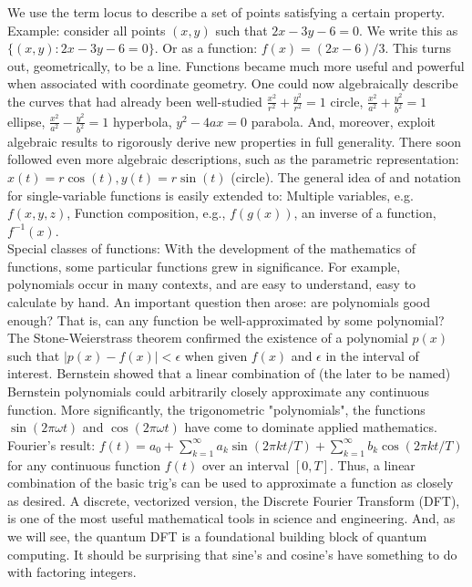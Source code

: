 \documentclass[main.tex]{subfiles}
\begin{document}
We use the term locus to describe a set of points satisfying a certain property. Example: consider all points $(x, y)$ such that $2 x-3 y-6=0$. We write this as $\{(x, y): 2 x-3 y-6=0\}$. Or as a function: $f(x)=(2 x-6) / 3$. This turns out, geometrically, to be a line. Functions became much more useful and powerful when associated with coordinate geometry. One could now algebraically describe the curves that had already been well-studied $\frac{x^{2}}{r^{2}}+\frac{y^{2}}{r^{2}}=1$ circle, $\frac{x^{2}}{a^{2}}+\frac{y^{2}}{b^{2}}=1$ ellipse, $\frac{x^{2}}{a^{2}}-\frac{y^{2}}{b^{2}}=1$ hyperbola, $y^{2}-4 a x=0$ parabola. And, moreover, exploit algebraic results to rigorously derive new properties in full generality. There soon followed even more algebraic descriptions, such as the parametric representation: $x(t)=r \cos (t), y(t)=r \sin (t)$ (circle). The general idea of and notation for single-variable functions is easily extended to: Multiple variables, e.g. $f(x, y, z)$, Function composition, e.g., $f(g(x))$, an inverse of a function, $f^{-1}(x)$.\\

Special classes of functions: With the development of the mathematics of functions, some particular functions grew in significance. For example, polynomials occur in many contexts, and are easy to understand, easy to calculate by hand. An important question then arose: are polynomials good enough? That is, can any function be well-approximated by some polynomial? The Stone-Weierstrass theorem confirmed the existence of a polynomial $p(x)$ such that $|p(x)-f(x)|<\epsilon$ when given $f(x)$ and $\epsilon$ in the interval of interest. Bernstein showed that a linear combination of (the later to be named) Bernstein polynomials could arbitrarily closely approximate any continuous function. More significantly, the trigonometric "polynomials", the functions $\sin (2 \pi \omega t)$ and $\cos (2 \pi \omega t)$ have come to dominate applied mathematics. Fourier's result: $f(t)=a_{0}+\sum_{k=1}^{\infty} a_{k} \sin (2 \pi k t / T)+\sum_{k=1}^{\infty} b_{k} \cos (2 \pi k t / T)$ for any continuous function $f(t)$ over an interval $[0, T]$. Thus, a linear combination of the basic trig's can be used to approximate a function as closely as desired. A discrete, vectorized version, the Discrete Fourier Transform (DFT), is one of the most useful mathematical tools in science and engineering. And, as we will see, the quantum DFT is a foundational building block of quantum computing. It should be surprising that sine's and cosine's have something to do with factoring integers.
\end{document}
